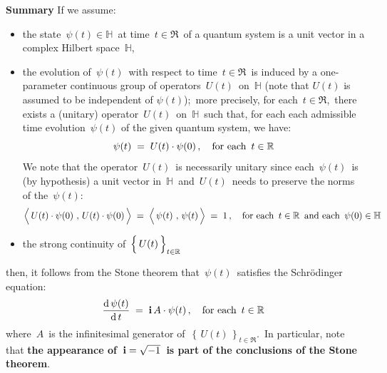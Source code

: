 \textbf{Summary}
\vskip 0.1cm
\noindent
If we assume:
\begin{itemize}
\item
	the state \,$\psi(t) \in \mathbb{H}$\, at time \,$t \in \Re$\, of a quantum system
	is a {\color{red}unit vector} in a complex Hilbert space \,$\mathbb{H}$,\,
\item
	the evolution of \,$\psi(t)$\, with respect to time \,$t \in \Re$\,
	is {\color{red}induced by a one-parameter continuous group}
	of operators \,$U(t)$\, on \,$\mathbb{H}$
    (note that $U(t)$ is assumed to be independent of $\psi(t)$);\,
	more precisely, for each \,$t \in \Re$,\, there exists a (unitary) operator
	\,$U(t)$\, on \,$\mathbb{H}$\, such that,
	for each each admissible time evolution \,$\psi(t)$ of the given quantum system,
	we have:
	\begin{equation*}
	\psi(t) \; = \; U(t) \cdot \psi(0)\,,
	\quad
	\textnormal{for each \,$t \in \Re$}
	\end{equation*}
	We note that the operator \,$U(t)$\, is necessarily unitary since each \,$\psi(t)$\,
	is (by hypothesis) a unit vector in \,$\mathbb{H}$\, and
	\,$U(t)$\, needs to preserve the norms of the \,$\psi(t)$:\,
	\begin{equation*}
	\left\langle\,U(t)\cdot\psi(0)
		\,\overset{{\color{white}\textnormal{\large1}}}{,}\,
		U(t)\cdot\psi(0)\,\right\rangle
	\; = \;
		\left\langle\,\psi(t)
			\,\overset{{\color{white}\textnormal{\large1}}}{,}\,
			\psi(t)\,\right\rangle
	\; = \;
		1\,,
	\quad
	\textnormal{for each \,$t \in \Re$\, and each \,$\psi(0) \in \mathbb{H}$}
	\end{equation*}
\item
	the {\color{red}strong continuity} of
	\,$\left\{\,\overset{{\color{white}.}}{U(t)}\,\right\}_{t \in \Re}$\,
\end{itemize}
then, it follows from the Stone theorem that \,$\psi(t)$\, satisfies the Schr\"odinger equation:
\begin{equation*}
\dfrac{\d\,\psi(t)}{\d\,t}
\; = \;
\i\,A\cdot \psi(t)\,,
\quad
\textnormal{for each \,$t\in\Re$	}
\end{equation*}
where \,$A$\, is the infinitesimal generator of \,$\left\{\,U(t)\,\right\}_{t\in\Re}$.\,
In particular, note that
\textbf{\color{red}the appearance of \,$\i = \sqrt{-1}$\, is part of the conclusions of the Stone theorem}.


